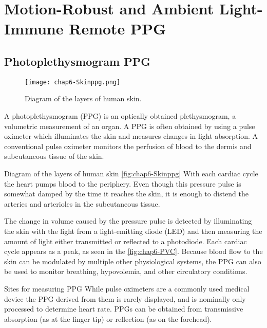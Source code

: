 \chapter{Motion-Robust and Ambient Light-Immune Remote PPG} %

\label{Chapter6} %


\section {Photoplethysmogram PPG \cite{wiki-PPG}}
\begin{figure}[hb]
  \centering
    \texttt{[image: chap6-Skinppg.png]}
  \caption{Diagram of the layers of human skin.}
  \label{fig:chap6-Skinppg}
\end{figure}

A photoplethysmogram (PPG) is an optically obtained plethysmogram, a volumetric measurement of an organ.
A PPG is often obtained by using a pulse oximeter which illuminates the skin and measures changes in light absorption.
A conventional pulse oximeter monitors the perfusion of blood to the dermis and subcutaneous tissue of the skin.

Diagram of the layers of human skin \autoref{fig:chap6-Skinppg} With each cardiac cycle the heart pumps
blood to the periphery. Even though this pressure pulse is somewhat damped
by the time it reaches the skin, it is enough to distend the arteries and
arterioles in the subcutaneous tissue.

The change in volume caused by the pressure pulse is detected by illuminating the skin
with the light from a light-emitting diode (LED) and then measuring the amount of
light either transmitted or reflected to a photodiode.
Each cardiac cycle appears as a peak, as seen in the \autoref{fig:chap6-PVC}.
Because blood flow to the skin can be modulated by multiple other physiological systems,
the PPG can also be used to monitor breathing, hypovolemia,
and other circulatory conditions.

Sites for measuring PPG
While pulse oximeters are a commonly used medical device the PPG derived from them is
rarely displayed, and is nominally only processed to determine heart rate.
PPGs can be obtained from transmissive absorption (as at the finger tip) or
reflection (as on the forehead).

